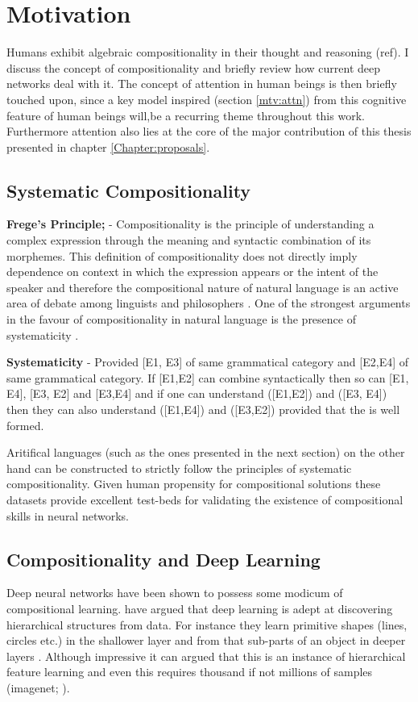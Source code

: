 \section{Motivation} \label{Chapter:motivation}
Humans exhibit algebraic compositionality in their thought and reasoning (ref). I discuss the concept of compositionality and briefly review how current deep networks deal with it. The concept of attention in human beings is then briefly touched upon, since a key model inspired (section \ref{mtv:attn}) from this cognitive feature of human beings will,be a recurring theme throughout this work. Furthermore attention also lies at the core of the major contribution of this thesis presented in chapter \ref{Chapter:proposals}.

\subsection{Systematic Compositionality} \label{systematic}
\textbf{Frege's Principle;} \citep{Pelletier1994} - Compositionality is the principle of understanding a complex expression through the meaning and syntactic combination of its morphemes. This definition of compositionality does not directly imply dependence on context in which the expression appears or the intent of the speaker and therefore the compositional nature of natural language is an active area of debate among linguists and philosophers \citep{sep-compositionality}. One of the strongest arguments in the favour of compositionality in natural language is the presence of systematicity \citep{fodor1989psychosemantics}. 

\textbf{Systematicity} - Provided [E1, E3] of same grammatical category and [E2,E4] of same grammatical category. If [E1,E2] can combine syntactically then so can [E1, E4], [E3, E2] and [E3,E4] and if one can understand ([E1,E2]) and ([E3, E4]) then they can also understand ([E1,E4]) and ([E3,E2]) provided that the is well formed.

Aritifical languages (such as the ones presented in the next section) on the other hand can be constructed to strictly follow the principles of systematic compositionality. Given human propensity for compositional solutions \citep{NIPS2016_6130} these datasets provide excellent test-beds for validating the existence of compositional skills in neural networks. 

\subsection{Compositionality and Deep Learning}
Deep neural networks have been shown to possess some modicum of compositional learning. \cite{LeCun2015} have argued that deep learning is adept at discovering hierarchical structures from data. For instance they learn primitive shapes (lines, circles etc.) in the shallower layer and from that sub-parts of an object in deeper layers \citep{Zeiler2014}. Although impressive it can argued that this is an instance of hierarchical feature learning and even this requires thousand if not millions of samples (imagenet; \citep{Deng2009}).

